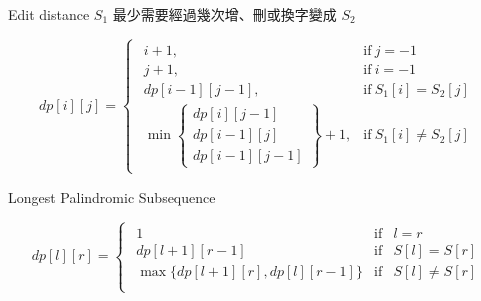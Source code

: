 Edit distance $S_1$ 最少需要經過幾次增、刪或換字變成 $S_2$
\begin{tiny}
    \[
        dp[i][j] = 
        \begin{cases}
            \begin{array}{cl}
                i+1, & \mbox{if} \ j=-1 \\
                j+1, & \mbox{if} \ i=-1 \\
                dp[i-1][j-1], & \mbox{if} \ S_1[i] = S_2[j] \\
                \min\left \{
                    \begin{array}{c}
                        dp[i][j-1] \\ dp[i-1][j] \\ dp[i-1][j-1]
                    \end{array}\right
                \}+1, & \mbox{if} \ S_1[i] \neq S_2[j]
            \end{array}
        \end{cases}
    \]
\end{tiny}

{\raggedright
    Longest Palindromic Subsequence \par
}
\begin{tiny}
    \[
        dp[l][r] =
        \begin{cases}
            \begin{array}{crc}
                1 & \mbox{if} & l = r \\
                dp[l+1][r-1] & \mbox{if} & S[l] = S[r] \\
                \max\{dp[l+1][r], dp[l][r-1]\} & \mbox{if} & S[l] \neq S[r] \\
            \end{array}
        \end{cases}
    \]
\end{tiny}